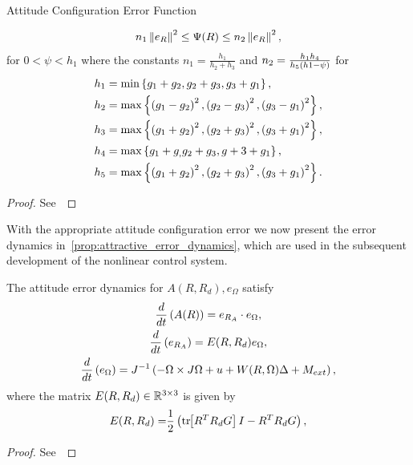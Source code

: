 \begin{prop}{Attitude Configuration Error Function}
\begin{enumerate}
    \begin{align}\label{eq:A_bound}
        n_1 \left\| e_R \right\|^2 \leq \Psi(R) \leq n_2 \left\| e_R \right\|^2 ,
    \end{align}
    for $0<\psi < h_1 $ where the constants \( n_1 = \frac{h_1}{h_2 + h_3} \) and \( n_2 = \frac{h_1 h_4}{h_5 \left( h1 - \psi \right) }\) for
	\begin{align*}
		h_1 &= \min\left\{ g_1 + g_2, g_2 + g_3 , g_3 + g_1 \right\} ,\\
		h_2 &= \max\left\{ \left( g_1 -g_2 \right)^2,\left( g_2 -g_3 \right)^2 , \left( g_3 -g_1 \right)^2 \right\} ,\\
		h_3 &= \max\left\{ \left( g_1 + g_2 \right)^2, \left( g_2 + g_3 \right)^2 , \left( g_3 + g_1 \right)^2 \right\}, \\		
        h_4 &= \max\left\{ g_1 + g_, g_2 +g_3, g+3 + g_1 \right\}, \\
        h_5 &= \max\left\{ \left( g_1 + g_2 \right)^2, \left( g_2 + g_3 \right)^2, \left( g_3 + g_1 \right)^2 \right\}.
	\end{align*}
\end{enumerate}
\end{prop}
\begin{proof}
    See~
\end{proof}

With the appropriate attitude configuration error we now present the error dynamics in~\cref{prop:attractive_error_dynamics}, which are used in the subsequent development of the nonlinear control system.
\begin{prop}\label{prop:attractive_error_dynamics}
    The attitude error dynamics for \( A(R, R_d), e_\Omega \) satisfy
	\begin{gather}
    	\frac{d }{d t} \left( A(R) \right) = e_{R_A} \cdot e_\Omega , \label{eq:A_dot} \\
		\frac{d }{d t} \left( e_{R_A} \right) = E(R, R_d) e_\Omega , \label{eq:eRA_dot} \\
        \frac{d }{d t} \left( e_\Omega \right) = J^{-1} \left( -\Omega \times J \Omega + u + W(R, \Omega) \Delta + M_{ext} \right) , \label{eq:eW_dot}
	\end{gather}
	where the matrix \(E(R,R_d)\in \mathbb{R}^{3\times3} \) is given by
	\begin{align}
		E(R,R_d) = &\frac{1}{2} \left( \mathrm{tr}\negthickspace\left[ R^T R_d G \right]I - R^T R_d G \right) , \label{eq:E} \\
	\end{align}
\end{prop}
\begin{proof}
    See~
\end{proof}

